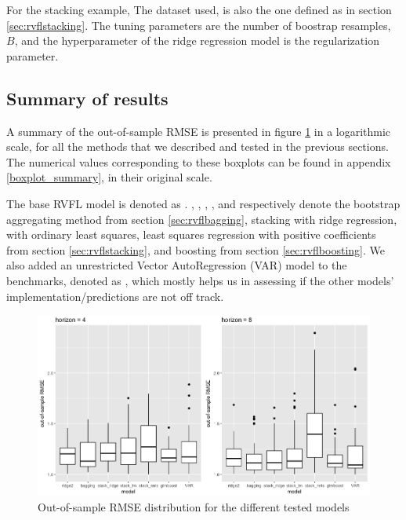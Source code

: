 For the stacking example, The dataset used, is also the one defined as  in section \ref{sec:rvflstacking}. The tuning parameters are the number of boostrap resamples, $B$, and the hyperparameter of the ridge regression model is the regularization parameter.

\subsection{Summary of results}
\label{results_summary}

A summary of the out-of-sample RMSE is presented in figure \ref{boxplot_perfs} in a logarithmic scale, for all the methods that we described and tested in the previous sections. The numerical values corresponding to these boxplots can be found in appendix \ref{boxplot_summary}, in their original scale.

The base RVFL model is denoted as . , , , , and  respectively denote the bootstrap aggregating method from section \ref{sec:rvflbagging}, stacking with ridge regression, with ordinary least squares, least squares regression with positive coefficients from section \ref{sec:rvflstacking}, and boosting from section \ref{sec:rvflboosting}. We also added an unrestricted Vector AutoRegression (VAR) model to the benchmarks, denoted as , which mostly helps us in assessing if the other models' implementation/predictions are not off track.

\begin{figure}[!htb]
\centering
\includegraphics[width=14cm]{gfx/chapter-rvfl-ensembles/boxplot_perfs.png}
\caption{Out-of-sample RMSE distribution for the different tested models}
\label{boxplot_perfs}
\end{figure}

